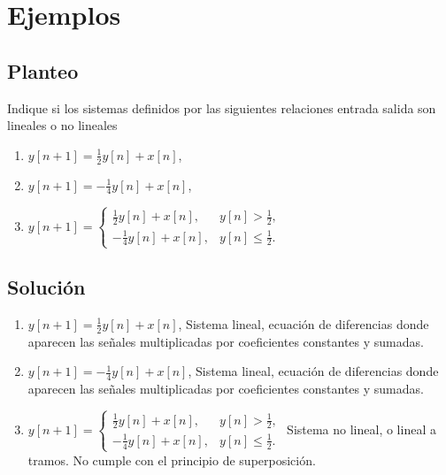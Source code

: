 \section{Ejemplos}

\subsection{Planteo}

Indique si los sistemas definidos por las siguientes relaciones entrada salida son lineales o no lineales
\begin{enumerate}
\item $y\left[ n+1\right] =\frac{1}{2}y\left[ n\right] +x\left[
    n\right]$,

\item $y\left[ n+1\right] =-\frac{1}{4}y\left[ n\right] +x\left[
    n\right]$,

\item $y\left[ n+1\right] =\left\{
    \begin{array}{c}
      \frac{1}{2}y\left[ n\right] +x\left[ n\right] , \\ 
      -\frac{1}{4}y\left[ n\right] +x\left[ n\right] ,
    \end{array}
    \begin{array}{c}
      y\left[ n\right] >\frac{1}{2}, \\ 
      y\left[ n\right] \leq \frac{1}{2}.
    \end{array}
  \right. $
\end{enumerate}

\subsection{Solución}

\begin{enumerate}
	\item $y\left[ n+1\right] =\frac{1}{2}y\left[ n\right] +x\left[
	n\right]$, Sistema lineal, ecuación de diferencias donde aparecen las señales multiplicadas por coeficientes constantes y sumadas.
	
	\item $y\left[ n+1\right] =-\frac{1}{4}y\left[ n\right] +x\left[
	n\right]$, Sistema lineal, ecuación de diferencias donde aparecen las señales multiplicadas por coeficientes constantes y sumadas.
	
	\item $y\left[ n+1\right] =\left\{
	\begin{array}{c}
		\frac{1}{2}y\left[ n\right] +x\left[ n\right] , \\ 
		-\frac{1}{4}y\left[ n\right] +x\left[ n\right] ,
	\end{array}
	\begin{array}{c}
		y\left[ n\right] >\frac{1}{2}, \\ 
		y\left[ n\right] \leq \frac{1}{2}.
	\end{array}
	\right. $ Sistema no lineal, o lineal a tramos. No cumple con el principio de superposición.
\end{enumerate}

